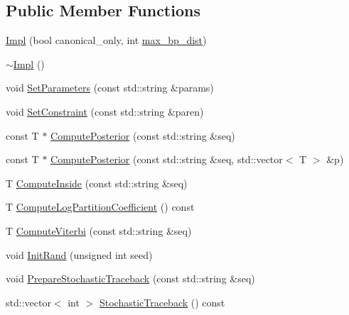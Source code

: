 \subsection*{Public Member Functions}
\begin{DoxyCompactItemize}
\item 
\hyperlink{struct_c_o_n_t_r_afold_1_1_impl_a312d688c6e7568435fa35d0a624ce94e}{Impl} (bool canonical\+\_\+only, int \hyperlink{class_c_o_n_t_r_afold_a4cd8f0e5b42ac575ffc1f360bc27a963}{max\+\_\+bp\+\_\+dist})
\item 
\hyperlink{struct_c_o_n_t_r_afold_1_1_impl_af5de568723f5422c34617874aefaf3c2}{$\sim$\+Impl} ()
\item 
void \hyperlink{struct_c_o_n_t_r_afold_1_1_impl_a04ecbadb15188fee33e39452e9ddccb1}{Set\+Parameters} (const std\+::string \&params)
\item 
void \hyperlink{struct_c_o_n_t_r_afold_1_1_impl_a4aebb03dbef26f0acf99ad46c04efb56}{Set\+Constraint} (const std\+::string \&paren)
\item 
const T $\ast$ \hyperlink{struct_c_o_n_t_r_afold_1_1_impl_aa715d3a69d3a0fbdc9a0516890e78fcf}{Compute\+Posterior} (const std\+::string \&seq)
\item 
const T $\ast$ \hyperlink{struct_c_o_n_t_r_afold_1_1_impl_a826bd0169d91fd00f8cb921bbe84a9ff}{Compute\+Posterior} (const std\+::string \&seq, std\+::vector$<$ T $>$ \&p)
\item 
T \hyperlink{struct_c_o_n_t_r_afold_1_1_impl_ad612db1ca63f65e6ab924c4204deee34}{Compute\+Inside} (const std\+::string \&seq)
\item 
T \hyperlink{struct_c_o_n_t_r_afold_1_1_impl_a3bdbe12d8de98901a6b8e2da71092f1a}{Compute\+Log\+Partition\+Coefficient} () const 
\item 
T \hyperlink{struct_c_o_n_t_r_afold_1_1_impl_a65cfdf3de5b950534835ac9a47d3a701}{Compute\+Viterbi} (const std\+::string \&seq)
\item 
void \hyperlink{struct_c_o_n_t_r_afold_1_1_impl_a77e4701e5cd211d2ddebb1a72fa160bb}{Init\+Rand} (unsigned int seed)
\item 
void \hyperlink{struct_c_o_n_t_r_afold_1_1_impl_ae05e41f99c06e7e00ac29fb11d56c804}{Prepare\+Stochastic\+Traceback} (const std\+::string \&seq)
\item 
std\+::vector$<$ int $>$ \hyperlink{struct_c_o_n_t_r_afold_1_1_impl_a693013d28e70deaeed099d0f1e24fbe3}{Stochastic\+Traceback} () const 
\end{DoxyCompactItemize}
